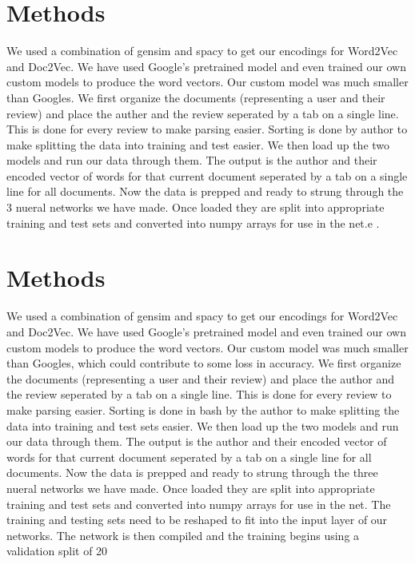 \documentclass[conference]{IEEEtran}
\begin{document}
\section{Methods}
We used a combination of gensim and spacy to get our encodings for Word2Vec and Doc2Vec. We have used Google's pretrained model and even trained our own custom models to produce the word vectors. Our custom model was much smaller than Googles. We first organize the documents (representing a user and their review) and place the auther and the review seperated by a tab on a single line. This is done for every review to make parsing easier. Sorting is done by author to make splitting the data into training and test easier. We then load up the two models and run our data through them. The output is the author and their encoded vector of words for that current document seperated by a tab on a single line for all documents. Now the data is prepped and ready to strung through the 3 nueral networks we have made. Once loaded they are split into appropriate training and test sets and converted into numpy arrays for use in the net.e \cite{b3}.

\section{Methods}
We used a combination of gensim and spacy to get our encodings for Word2Vec and Doc2Vec. We have used Google's pretrained model and even trained our own custom models to produce the word vectors. Our custom model was much smaller than Googles, which could contribute to some loss in accuracy. We first organize the documents (representing a user and their review) and place the author and the review seperated by a tab on a single line. This is done for every review to make parsing easier. Sorting is done in bash by the author to make splitting the data into training and test sets easier. We then load up the two models and run our data through them. The output is the author and their encoded vector of words for that current document seperated by a tab on a single line for all documents. Now the data is prepped and ready to strung through the three nueral networks we have made. Once loaded they are split into appropriate training and test sets and converted into numpy arrays for use in the net. The training and testing sets need to be reshaped to fit into the input layer of our networks. The network is then compiled and the training begins using a validation split of 20%
\end{document}
